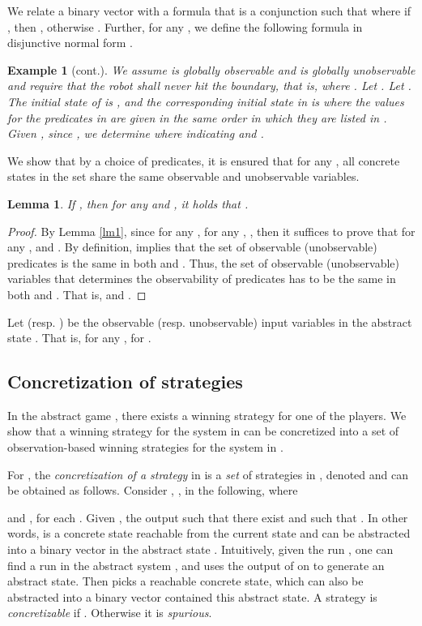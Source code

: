 \documentclass[letterpaper, 10 pt, conference]{ieeeconf}
\newtheorem{lemma}{Lemma}
\newtheorem{example}{Example}
\begin{document}
We relate a binary vector  with a formula  that is a conjunction such that 
 where if ,
then , otherwise . 
Further, for any , we define the following formula in disjunctive normal
form .

\addtocounter{example}{-1}
\begin{example}[cont.]We assume  is globally
  observable and  is globally unobservable and require
  that the robot shall never hit the boundary, that is,  where . Let .
 Let . The initial state of
   is , and the corresponding
  initial state in  is 
  where the values for the predicates in  are given in the same
  order in which they are listed in . Given , since , we determine  where  indicating 
  and .
\end{example}
We show that by a choice of predicates, it is ensured that for any
, all concrete states in the set  share the same observable and unobservable
variables.
\begin{lemma}
  If , then for any  and , it holds that
  .
\end{lemma}
\begin{proof}
  By Lemma \ref{lm1}, since for any , for any , , then it suffices to
  prove that for any ,  and
  . By definition,  implies that the set
  of observable (unobservable) predicates is the same in both  and
  . Thus, the set of observable (unobservable) variables that
  determines the observability of predicates has to be the same in both  and . That is,  and .
\end{proof}Let  (resp. ) be the
observable (resp. unobservable) input variables in the abstract  state
. That is,  for any , for .

\subsection{Concretization of strategies}
In the abstract game , there exists a winning strategy
for one of the players. We show that a winning strategy for the system
in  can be concretized into a set of observation-based
winning strategies for the system in .

For , the
  \emph{concretization of a strategy}  in  is a \emph{set} of strategies in , denoted
   and can be obtained as follows. Consider , ,  in the following,
  where
\vspace{-1ex}
  
and ,  for each .
Given , the output  such that there exist  and  such that . In other words,  is a concrete state
reachable from the current state  and can be abstracted into a
binary vector  in the abstract state . Intuitively,
given the run , one can find a run in the abstract system
, and uses the output of  on  to generate an
abstract state. Then  picks a reachable concrete state, which
can also be abstracted into a binary vector contained this abstract
state. A strategy  is \emph{concretizable} if . Otherwise it is \emph{spurious}.
\end{document}
